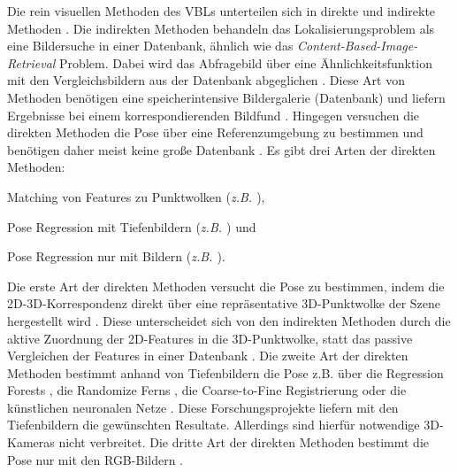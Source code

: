 Die rein visuellen Methoden des VBLs unterteilen sich in direkte und indirekte Methoden \cite{lowryVisualPlaceRecognition2016}. Die indirekten Methoden behandeln das Lokalisierungsproblem als eine Bildersuche in einer Datenbank, ähnlich wie das \textit{Content-Based-Image-Retrieval} \cite{lewContentbasedMultimediaInformation2006} Problem. Dabei wird das Abfragebild über eine Ähnlichkeitsfunktion mit den Vergleichsbildern aus der Datenbank abgeglichen \cite{zhangImageBasedLocalization2006}. Diese Art von Methoden benötigen eine speicherintensive Bildergalerie (Datenbank) und liefern Ergebnisse bei einem korrespondierenden Bildfund \cite{lowryVisualPlaceRecognition2016}. Hingegen versuchen die direkten Methoden die Pose über eine Referenzumgebung zu bestimmen und benötigen daher meist keine große Datenbank \cite{piascoSurveyVisualBasedLocalization2018}. Es gibt drei Arten der direkten Methoden: 
\begin{enumerate*}[label=\arabic*)]
	\item Matching von Features zu Punktwolken (\textit{z.B. \cite{liWorldwidePoseEstimation2012}}),
	\item Pose Regression mit Tiefenbildern (\textit{z.B. \cite{shottonSceneCoordinateRegression2013}}) und
	\item Pose Regression nur mit Bildern (\textit{z.B. \cite{kendallPoseNetConvolutionalNetwork2015}}).
\end{enumerate*}

Die erste Art der direkten Methoden versucht die Pose zu bestimmen, indem die 2D-3D-Korrespondenz direkt über eine repräsentative 3D-Punktwolke der Szene hergestellt wird \cite{piascoSurveyVisualBasedLocalization2018}. Diese unterscheidet sich von den indirekten Methoden durch die aktive Zuordnung der 2D-Features in die 3D-Punktwolke, statt das passive Vergleichen der Features in einer Datenbank \cite{irscharaStructurefrommotionPointClouds2009}. Die zweite Art der direkten Methoden bestimmt anhand von Tiefenbildern die Pose z.B. über die Regression Forests \cite{shottonSceneCoordinateRegression2013}, die Randomize Ferns \cite{glockerRealTimeRGBDCamera2015}, die Coarse-to-Fine Registrierung \cite{santosMappingIndoorSpaces2016} oder die künstlichen neuronalen Netze \cite{massicetiRandomForestsNeural2017}. Diese Forschungsprojekte liefern mit den Tiefenbildern die gewünschten Resultate. Allerdings sind hierfür notwendige 3D-Kameras nicht verbreitet. Die dritte Art der direkten Methoden bestimmt die Pose nur mit den RGB-Bildern \cite{kendallPoseNetConvolutionalNetwork2015}.

